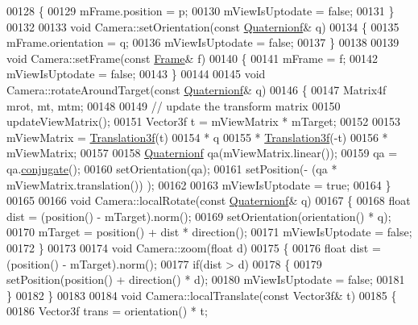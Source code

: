 \begin{DoxyCode}
00128 \{
00129     mFrame.position = p;
00130     mViewIsUptodate = \textcolor{keyword}{false};
00131 \}
00132 
00133 \textcolor{keywordtype}{void} Camera::setOrientation(\textcolor{keyword}{const} \hyperlink{group___geometry___module_class_eigen_1_1_quaternion}{Quaternionf}& q)
00134 \{
00135     mFrame.orientation = q;
00136     mViewIsUptodate = \textcolor{keyword}{false};
00137 \}
00138 
00139 \textcolor{keywordtype}{void} Camera::setFrame(\textcolor{keyword}{const} \hyperlink{class_frame}{Frame}& f)
00140 \{
00141   mFrame = f;
00142   mViewIsUptodate = \textcolor{keyword}{false};
00143 \}
00144 
00145 \textcolor{keywordtype}{void} Camera::rotateAroundTarget(\textcolor{keyword}{const} \hyperlink{group___geometry___module_class_eigen_1_1_quaternion}{Quaternionf}& q)
00146 \{
00147     Matrix4f mrot, mt, mtm;
00148     
00149     \textcolor{comment}{// update the transform matrix}
00150     updateViewMatrix();
00151     Vector3f t = mViewMatrix * mTarget;
00152 
00153     mViewMatrix = \hyperlink{group___geometry___module_class_eigen_1_1_translation}{Translation3f}(t)
00154                 * q
00155                 * \hyperlink{group___geometry___module_class_eigen_1_1_translation}{Translation3f}(-t)
00156                 * mViewMatrix;
00157     
00158     \hyperlink{group___geometry___module_class_eigen_1_1_quaternion}{Quaternionf} qa(mViewMatrix.linear());
00159     qa = qa.\hyperlink{group___geometry___module_aa82dabadce488031c298a5a0a92cda14}{conjugate}();
00160     setOrientation(qa);
00161     setPosition(- (qa * mViewMatrix.translation()) );
00162 
00163     mViewIsUptodate = \textcolor{keyword}{true};
00164 \}
00165 
00166 \textcolor{keywordtype}{void} Camera::localRotate(\textcolor{keyword}{const} \hyperlink{group___geometry___module_class_eigen_1_1_quaternion}{Quaternionf}& q)
00167 \{
00168     \textcolor{keywordtype}{float} dist = (position() - mTarget).norm();
00169     setOrientation(orientation() * q);
00170     mTarget = position() + dist * direction();
00171     mViewIsUptodate = \textcolor{keyword}{false};
00172 \}
00173 
00174 \textcolor{keywordtype}{void} Camera::zoom(\textcolor{keywordtype}{float} d)
00175 \{
00176     \textcolor{keywordtype}{float} dist = (position() - mTarget).norm();
00177     \textcolor{keywordflow}{if}(dist > d)
00178     \{
00179         setPosition(position() + direction() * d);
00180         mViewIsUptodate = \textcolor{keyword}{false};
00181     \}
00182 \}
00183 
00184 \textcolor{keywordtype}{void} Camera::localTranslate(\textcolor{keyword}{const} Vector3f& t)
00185 \{
00186   Vector3f trans = orientation() * t;

\end{DoxyCode}
